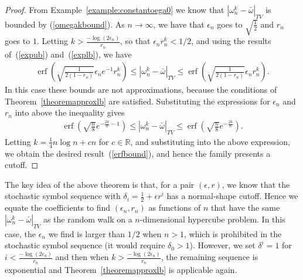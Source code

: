 \documentclass[final]{siamltex}
\DeclareMathOperator{\erf}{erf}
\begin{document}
\begin{proof}
  From Example~\ref{example:constantoega0} we know that $|\omega^k_n -
  \bar{\omega}|_{TV}$ is bounded by (\ref{omegakbound}). As $n \to
  \infty$, we have that $\epsilon_n$ goes to $\sqrt{\frac{1}{2}}$ and $r_n$ goes to
  $1$. Letting $k> \frac{-\log(2\epsilon_n)}{r_n}$, so that $\epsilon_n
  r_n^k<1/2$, and using the results of~(\ref{expub}) and~(\ref{explb}), we have
  \begin{align}
    \erf\left( \sqrt{\frac{1}{2(1-r_n)}} \epsilon_n e^{-1} r_n^k \right)
    \le |\omega^k_n - \bar{\omega}|_{TV}
    \le \erf\left( \sqrt{\frac{1}{2(1-r_n)}} \epsilon_nr_n^k \right).
  \end{align}
  In this case these bounds are not approximations, because the
  conditions of Theorem~\ref{theoremapproxlb} are satisfied.
  Substituting the expressions for $\epsilon_n$ and $r_n$ into above
  the inequality gives
  \begin{align}
    \erf\left(\sqrt{\frac{n}{8}}e^{-\frac{2k}{n}-1}  \right)
    \le |\omega^k_n - \bar{\omega}|_{TV}
    \le  \erf\left(\sqrt{\frac{n}{8}}e^{-\frac{2k}{n}}  \right).
  \end{align}
  Letting $k = \frac{1}{4}n\log{n}+cn $ for $c\in \mathbb{R}$, and
  substituting into the above expression, we obtain the desired
  result~(\ref{erfbound}), and hence the family presents a cutoff.
\end{proof}


The key idea of the above theorem is that, for a pair $(\epsilon,r)$,
we know that the stochastic symbol sequence with $\delta_i =
\frac{1}{2}+\epsilon r^i$ has a normal-shape cutoff. Hence we equate
the coefficients to find $(\epsilon_n,r_n)$ as functions of $n$ that
have the same $|\omega^k_n - \bar{\omega} |_{TV}$ as the random walk
on a $n$-dimensional hypercube problem. In this case, the $\epsilon_n$
we find is larger than $1/2$ when $n>1$, which is prohibited in the
stochastic symbol sequence (it would require $\delta_0>1$). However,
we set $\delta^i=1$ for $i<\frac{-\log(2\epsilon_n)}{r_n}$ and then
when $k> \frac{-\log(2\epsilon_n)}{r_n}$, the remaining sequence is
exponential and Theorem~\ref{theoremapproxlb} is applicable again.
\end{document}
